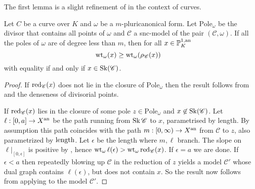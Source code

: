 	The first lemma is a slight refinement of \cite[prop.\ 4.4.4]{mustataWeightFunctionsNonArchimedean2015} in the context of curves.
	\begin{lemma}\label{lem:well_behaved_pole_weight}
	Let $C$ be a curve over $K$ and $\omega$ be a $m$-pluricanonical form.
	Let $\mathrm{Pole}_\omega$ be the divisor that contains all points of $\omega$ and $\mathscr C$ a snc-model of the pair $(\mathscr C, \omega)$.  
	If all the poles of $\omega$ are of degree less than $m$, then for all $x \in \mathbb{P}^{1, \text{an}}_K$ \[
		\operatorname{wt}_\omega(x) \ge \operatorname{wt}_\omega(\rho_{\mathscr C}(x))
	\] 
	with equality if and only if $x \in \operatorname{Sk}(\mathscr C)$. 
\end{lemma}
\begin{proof}
	If $\operatorname{red}_{\mathscr C}(x)$ does not lie in the closure of $\mathrm{Pole}_\omega$ then the result follows from \cite[prop.\ 4.4.4.(2)]{mustataWeightFunctionsNonArchimedean2015} and the denseness of divisorial points. 

	If $\operatorname{red}_{\mathscr C}(x)$ lies in the closure of some pole $z \in \mathrm{Pole}_\omega$ and $x \not\in \operatorname{Sk}(\mathscr C)$. 
	Let $\ell: [0, a] \to X{}^{\text{an}}$ be the path running from $\operatorname{Sk} \mathscr C$ to $x$, parametrised by length. 
	By assumption this path coincides with the path $m: [0, \infty) \to X{}^{\text{an}}$ from $\mathscr C$ to $z$, also parametrized by $\operatorname{length}$.
	Let $\epsilon$ be the length where $m, \ell$ branch. 
	The slope on  $\ell|_{[0, \epsilon]}$ is positive by \cite[thm.\ 3.2.3.(2)]{bakerWeightFunctionsBerkovich2016} , hence $\wt_\omega \ell(\epsilon) > \wt_\omega \red_{\mathscr C}(x)$.
	If $\epsilon = a$ we are done. 
	If $\epsilon < a$ then repeatedly blowing up $\mathscr C$ in the reduction of $z$ yields a model $\mathscr C'$ whose dual graph contains $\ell(\epsilon)$, but does not contain $x$.
	So the result now follows from applying \cite[prop.\ 4.4.4.(2)]{mustataWeightFunctionsNonArchimedean2015} to the model $\mathscr C'$. 
\end{proof}

